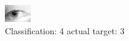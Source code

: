\begin{figure}[h!]
\begin{center}
\includegraphics[width=0.60\columnwidth]{figures/ID1401_class_4_target_3.png}
\end{center}
\caption{ Classification: 4 actual target: 3}
\label{fig:ID1401_class_4_target_3}
\end{figure}
